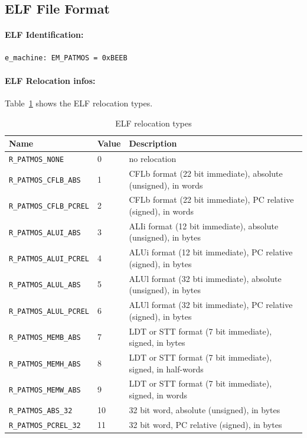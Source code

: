 \subsection{ELF File Format}

\paragraph{ELF Identification:}

\begin{verbatim}
e_machine: EM_PATMOS = 0xBEEB
\end{verbatim}

\paragraph{ELF Relocation infos:}
Table~\ref{tab:elfrelocs} shows the ELF relocation types.

\begin{table}
  \centering
  \begin{tabular}{lll}
    \toprule
    Name & Value & Description \\
    \midrule
\texttt{R\_PATMOS\_NONE}         & 0  & no relocation \\
\texttt{R\_PATMOS\_CFLB\_ABS}    & 1  & CFLb format (22 bit immediate), absolute (unsigned), in words \\
\texttt{R\_PATMOS\_CFLB\_PCREL}  & 2  & CFLb format (22 bit immediate), PC relative (signed), in words \\
\texttt{R\_PATMOS\_ALUI\_ABS}    & 3  & ALIi format (12 bit immediate), absolute (unsigned), in bytes \\
\texttt{R\_PATMOS\_ALUI\_PCREL}  & 4  & ALUi format (12 bit immediate), PC relative (signed), in bytes \\
\texttt{R\_PATMOS\_ALUL\_ABS}    & 5  & ALUl format (32 bti immediate), absolute (unsigned), in bytes \\
\texttt{R\_PATMOS\_ALUL\_PCREL}  & 6  & ALUl format (32 bit immediate), PC relative (signed), in bytes \\
\texttt{R\_PATMOS\_MEMB\_ABS}    & 7  & LDT or STT format (7 bit immediate), signed, in bytes \\
\texttt{R\_PATMOS\_MEMH\_ABS}    & 8  & LDT or STT format (7 bit immediate), signed, in half-words \\
\texttt{R\_PATMOS\_MEMW\_ABS}    & 9  & LDT or STT format (7 bit immediate), signed, in words \\
\texttt{R\_PATMOS\_ABS\_32}      & 10 & 32 bit word, absolute (unsigned), in bytes \\
\texttt{R\_PATMOS\_PCREL\_32}    & 11 & 32 bit word, PC relative (signed), in bytes \\
    \bottomrule    
  \end{tabular}
  \caption{ELF relocation types}
  \label{tab:elfrelocs}
\end{table}

